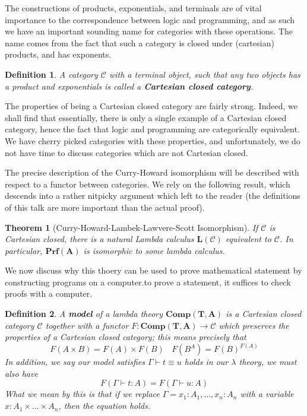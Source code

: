 \documentclass{article}
\theoremstyle{plain}
\newtheorem{theorem}{Theorem}
\newtheorem{definition}{Definition}
\begin{document}
The constructions of products, exponentials, and terminals are of vital importance to the correspondence between logic and programming, and as such we have an important sounding name for categories with these operations. The name comes from the fact that such a category is closed under (cartesian) products, and has exponents.

\begin{definition}
    A category $\mathcal{C}$ with a terminal object, such that any two objects has a product and exponentials is called a {\bf Cartesian closed category}.
\end{definition}

The properties of being a Cartesian closed category are fairly strong. Indeed, we shall find that essentially, there is only a single example of a Cartesian closed category, hence the fact that logic and programming are categorically equivalent. We have cherry picked categories with these properties, and unfortunately, we do not have time to discuss categories which are not Cartesian closed.

The precise description of the Curry-Howard isomorphism will be described with respect to a functor between categories. We rely on the following result, which descends into a rather nitpicky argument which left to the reader (the definitions of this talk are more important than the actual proof).

\begin{theorem}[Curry-Howard-Lambek-Lawvere-Scott Isomorphism]
    If $\mathcal{C}$ is Cartesian closed, there is a natural Lambda calculus $\mathbf{L}(\mathcal{C})$ equivalent to $\mathcal{C}$. In particular, $\mathbf{Prf}(\mathbf{A})$ is isomorphic to some lambda calculus.
\end{theorem}

We now discuss why this thoery can be used to prove mathematical statement by constructing programs on a computer.to prove a statement, it suffices to check proofs with a computer.

\begin{definition}
A {\bf model} of a lambda theory $\mathbf{Comp}(\mathbf{T},\mathbf{A})$ is a Cartesian closed category $\mathcal{C}$ together with a functor $F: \mathbf{Comp}(\mathbf{T}, \mathbf{A}) \to \mathcal{C}$ which preserves the properties of a Cartesian closed category; this means precisely that
%
\[ F(A \times B) = F(A) \times F(B)\ \ \ \ F(B^A) = F(B)^{F(A)} \]
%
In addition, we say our model satisfies $\Gamma \vdash t \equiv u$ holds in our $\lambda$ theory, we must also have
%
\[ F(\Gamma \vdash t : A) = F(\Gamma \vdash u:A) \]
%
What we mean by this is that if we replace $\Gamma = x_1: A_1, \dots, x_n: A_n$ with a variable $x: A_1 \times \dots \times A_n$, then the equation holds.
\end{definition}
\end{document}
